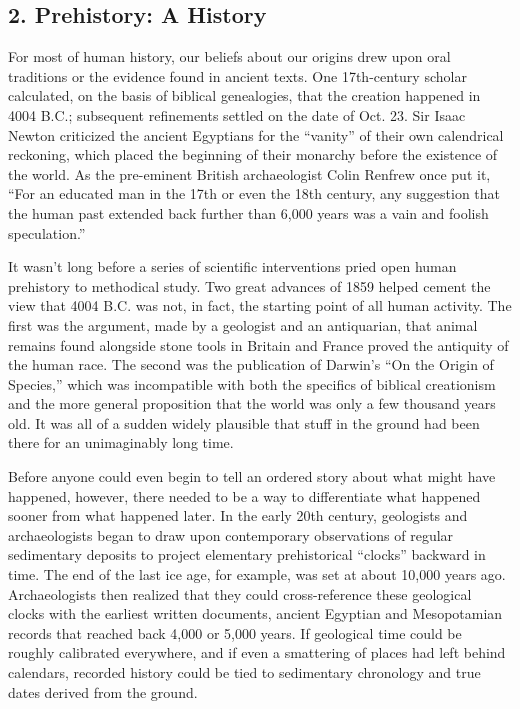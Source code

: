 \hypertarget{2-prehistory-a-history}{%
\subsection{\texorpdfstring{\textbf{2. Prehistory: A
History}}{2. Prehistory: A History}}\label{2-prehistory-a-history}}

For most of human history, our beliefs about our origins drew upon oral
traditions or the evidence found in ancient texts. One 17th-century
scholar calculated, on the basis of biblical genealogies, that the
creation happened in 4004 B.C.; subsequent refinements settled on the
date of Oct. 23. Sir Isaac Newton criticized the ancient Egyptians for
the ``vanity'' of their own calendrical reckoning, which placed the
beginning of their monarchy before the existence of the world. As the
pre-eminent British archaeologist Colin Renfrew once put it, ``For an
educated man in the 17th or even the 18th century, any suggestion that
the human past extended back further than 6,000 years was a vain and
foolish speculation.''

It wasn't long before a series of scientific interventions pried open
human prehistory to methodical study. Two great advances of 1859 helped
cement the view that 4004 B.C. was not, in fact, the starting point of
all human activity. The first was the argument, made by a geologist and
an antiquarian, that animal remains found alongside stone tools in
Britain and France proved the antiquity of the human race. The second
was the publication of Darwin's ``On the Origin of Species,'' which was
incompatible with both the specifics of biblical creationism and the
more general proposition that the world was only a few thousand years
old. It was all of a sudden widely plausible that stuff in the ground
had been there for an unimaginably long time.

Before anyone could even begin to tell an ordered story about what might
have happened, however, there needed to be a way to differentiate what
happened sooner from what happened later. In the early 20th century,
geologists and archaeologists began to draw upon contemporary
observations of regular sedimentary deposits to project elementary
prehistorical ``clocks'' backward in time. The end of the last ice age,
for example, was set at about 10,000 years ago. Archaeologists then
realized that they could cross-reference these geological clocks with
the earliest written documents, ancient Egyptian and Mesopotamian
records that reached back 4,000 or 5,000 years. If geological time could
be roughly calibrated everywhere, and if even a smattering of places had
left behind calendars, recorded history could be tied to sedimentary
chronology and true dates derived from the ground.

